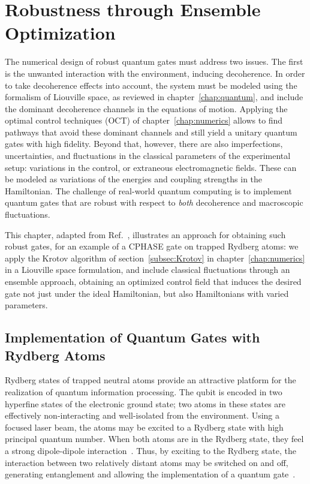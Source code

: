 \chapter{Robustness through Ensemble Optimization}
\label{chap:robust}

The numerical design of robust quantum gates must address two issues. The first
is the unwanted interaction with the environment, inducing decoherence.
In order to take decoherence effects into account, the
system must be modeled using the formalism of Liouville space, as
reviewed in chapter~\ref{chap:quantum}, and include the dominant decoherence
channels in the equations of motion.
Applying the optimal control techniques (OCT) of chapter~\ref{chap:numerics}
allows to find pathways that avoid these dominant channels and still yield
a unitary quantum gates with high fidelity.
Beyond that, however, there are also imperfections, uncertainties, and
fluctuations in the classical parameters of the experimental setup: variations
in the control, or extraneous electromagnetic fields. These can be modeled
as variations of the energies and coupling strengths in the Hamiltonian. The
challenge of real-world quantum computing is to implement quantum gates that are
robust with respect to \emph{both} decoherence and macroscopic fluctuations.

This chapter, adapted from Ref.~\cite{GoerzPRA2014}, illustrates an approach for
obtaining such robust gates, for an example of a CPHASE gate on trapped Rydberg
atoms: we apply the Krotov algorithm of section~\ref{subsec:Krotov} in
chapter~\ref{chap:numerics} in a Liouville space formulation, and include
classical fluctuations through an ensemble approach, obtaining an optimized control
field that induces the desired gate not just under the ideal Hamiltonian, but
also Hamiltonians with varied parameters.


\section{Implementation of Quantum Gates with Rydberg Atoms}
\label{sec:RydbergImplemenation}

Rydberg states of trapped neutral atoms provide an attractive platform for
the realization of quantum information processing. The qubit is encoded in two
hyperfine states of the electronic ground state; two atoms in these states are
effectively non-interacting and well-isolated from the environment.
Using a focused laser beam, the atoms may be excited to a Rydberg
state with high principal quantum number. When both atoms are in the Rydberg
state, they feel a strong dipole-dipole interaction~\cite{SaffmanRMP2010}.
Thus, by exciting to the Rydberg state, the interaction between two relatively
distant atoms may be switched on and off, generating entanglement and allowing
the implementation of a quantum gate~\cite{WilkPRL10,IsenhowerPRL10}.

